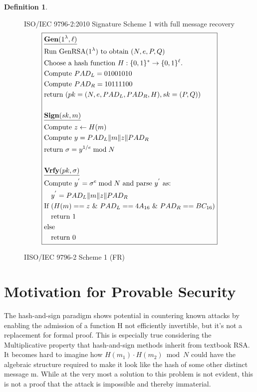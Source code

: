 \documentclass[]{final_report}
\theoremstyle{definition}
\newtheorem{definition}{Definition}[chapter]
\begin{document}
\begin{definition}
\begin{figure}[H]
\centering
\hfill ISO/IEC 9796-2:2010 Signature Scheme 1 with full message recovery\hfill\phantom{} 
\[
\boxed{
\begin{aligned}
&\underline{\textbf{\text{Gen}} (1^\lambda, \ell)} \\
&\text{Run GenRSA}(1^\lambda) \text{ to obtain } (N, e, P, Q) \\
&\text{Choose a hash function } H : \{0, 1\}^* \rightarrow \{0, 1\}^\ell. \\
&\text{Compute } PAD_{L} = 01001010 \\
&\text{Compute } PAD_{R} = 10111100 \\
&\text{return } (pk = (N, e, PAD_{L}, PAD_{R}, H), sk = (P, Q)) \\
\\
&\underline{\textbf{\text{Sign}} (sk, m)} \\
&\text{Compute } z \leftarrow H(m) \\
&\text{Compute } y = PAD_{L} \| m \| z \| PAD_{R} \\
&\text{return } \sigma = y^{1/e} \bmod N \\
\\
&\underline{\textbf{\text{Vrfy}} (pk, \sigma)} \\
&\text{Compute } y^{'} = \sigma^{e} \bmod N \text{ and parse } y^{'} \text{ as: } \\
&\quad y^{'} = PAD_{L} \| m \| z \| PAD_{R} \\
&\text{If } (H(m) == z \text{ } \& \text{ } PAD_{L} == 4A_{16} \text{ } \& \text{ } PAD_{R} == BC_{16}) \\
&\quad \text{return } 1 \\
&\text{else} \\
&\quad \text{return } 0 
\end{aligned}
}
\]
\caption{IISO/IEC 9796-2 Scheme 1 (FR)}
\label{fig:isoiec9796-full}
\end{figure}
\end{definition}


\section{Motivation for Provable Security}
The hash-and-sign paradigm shows potential in countering known attacks by enabling the admission of a function H not efficiently invertible, but it's not a replacement for formal proof. This is especially true considering the Multiplicative property that hash-and-sign methods inherit from textbook RSA. It becomes hard to imagine how $H(m_{1}) \cdot H(m_{2}) \bmod N$ could have the algebraic structure required to make it look like the hash of some other distinct message m. While at the very most a solution to this problem is not evident, this is not a proof that the attack is impossible and thereby immaterial.
\end{document}
